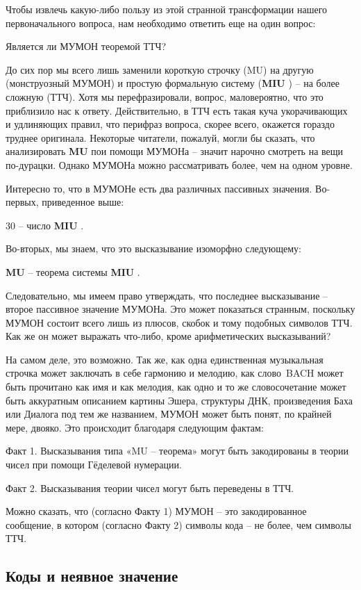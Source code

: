 \documentclass[../main.tex]{subfiles}
\begin{document}
Чтобы извлечь какую-либо пользу из этой странной трансформации нашего первоначального вопроса, нам необходимо ответить еще на один вопрос:

Является ли МУМОН теоремой ТТЧ?

До сих пор мы всего лишь заменили короткую строчку (MU) на другую (монструозный МУМОН) и простую формальную систему (\textbf{MIU} ) \--- на более сложную (ТТЧ). Хотя мы перефразировали, вопрос, маловероятно, что это приблизило нас к ответу. Действительно, в ТТЧ есть такая куча укорачивающих и удлиняющих правил, что перифраз вопроса, скорее всего, окажется гораздо труднее оригинала. Некоторые читатели, пожалуй, могли бы сказать, что анализировать \textbf{MU} пои помощи МУМОНа \--- значит нарочно смотреть на вещи по-дурацки. Однако МУМОНа можно рассматривать более, чем на одном уровне.

Интересно то, что в МУМОНе есть два различных пассивных значения. Во-первых, приведенное выше:

30 \--- число \textbf{MIU} .

Во-вторых, мы знаем, что это высказывание изоморфно следующему:

\textbf{MU} \--- теорема системы \textbf{MIU} .

Следовательно, мы имеем право утверждать, что последнее высказывание \--- второе пассивное значение МУМОНа. Это может показаться странным, поскольку МУМОН состоит всего лишь из плюсов, скобок и тому подобных символов ТТЧ\@. Как же он может выражать что-либо, кроме арифметических высказываний?

На самом деле, это возможно. Так же, как одна единственная музыкальная строчка может заключать в себе гармонию и мелодию, как слово~BACH может быть прочитано как имя и как мелодия, как одно и то же словосочетание может быть аккуратным описанием картины Эшера, структуры ДНК, произведения Баха или Диалога под тем же названием, МУМОН может быть понят, по крайней мере, двояко. Это происходит благодаря следующим фактам:

Факт 1. Высказывания типа «MU \--- теорема» могут быть закодированы в теории чисел при помощи Гёделевой нумерации.

Факт 2. Высказывания теории чисел могут быть переведены в ТТЧ.

Можно сказать, что (согласно Факту 1) МУМОН \--- это закодированное сообщение, в котором (согласно Факту 2) символы кода \--- не более, чем символы ТТЧ.


\subsection{Коды и неявное значение}
\end{document}
